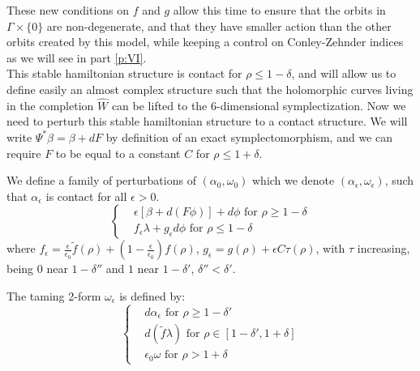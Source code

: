 \documentclass[../main.tex]{subfiles}
\begin{document}
These new conditions on $f$ and $g$ allow this time to ensure that the orbits in $\Gamma\times \{0\}$ are non-degenerate, and that they have smaller action than the other orbits created by this model, while keeping a control on Conley-Zehnder indices as we will see in part \ref{p:VI}.\\

This stable hamiltonian structure is contact for $\rho \leq 1-\delta $, and will allow us to define easily an almost complex structure such that the holomorphic curves living in the completion $\widehat{W}$ can be lifted to the $6$-dimensional symplectization. Now we need to perturb this stable hamiltonian structure to a contact structure. We will write $\Psi^*\beta = \beta + dF$ by definition of an exact symplectomorphism, and we can require $F$ to be equal to a constant $C$ for $\rho \leq 1+\delta$.

\begin{definition}
We define a family of perturbations of $(\alpha_0,\omega_0)$ which we denote $(\alpha_\epsilon,\omega_\epsilon)$, such that $\alpha_\epsilon$ is contact for all $\epsilon > 0$. \\

\begin{equation}
\left\{
    \begin{array}{ll}
     & \epsilon[\beta + d(F\phi)] + d\phi \mbox{ for  } \rho\geq 1-\delta\\ 
     & f_\epsilon\lambda + g_\epsilon d\phi \mbox{ for } \rho \leq 1-\delta 
    \end{array}
\right.
\end{equation}
where $f_\epsilon = \frac{\epsilon}{\epsilon_0}\tilde{f}(\rho) + (1-\frac{\epsilon}{\epsilon_0})f(\rho)$, $g_\epsilon  = g(\rho ) + \epsilon C \tau(\rho)$, with $\tau$ increasing, being $0$ near $1-\delta''$ and $1$ near $1-\delta '$, $\delta''<\delta'$.

The taming 2-form $\omega_\epsilon$ is defined by: 
\begin{equation}
\left\{
    \begin{array}{ll}
     &  d\alpha_\epsilon\mbox{ for  } \rho\geq 1-\delta'\\ 
     & d(\tilde f \lambda) \mbox{ for } \rho \in [1-\delta',1+\delta] \\
     & \epsilon_0\omega \mbox{ for } \rho > 1+\delta
    \end{array}
\right.
\end{equation}

\end{definition}
\end{document}
